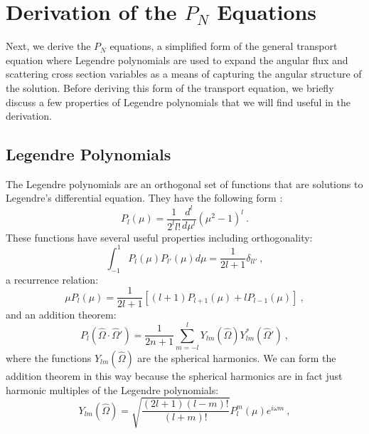 \section{Derivation of the $P_N$ Equations}
\label{sec:pn_equations}
Next, we derive the $P_N$ equations, a simplified form of the general
transport equation where Legendre polynomials are used to expand the
angular flux and scattering cross section variables as a means of
capturing the angular structure of the solution. Before deriving this
form of the transport equation, we briefly discuss a few properties of
Legendre polynomials that we will find useful in the derivation.

\subsection{Legendre Polynomials}
\label{subsec:legendre_polys}
The Legendre polynomials are an orthogonal set of functions that
are solutions to Legendre's differential equation. They have the
following form \citep{lewis_computational_1993}:
\begin{equation}
  P_l(\mu) = \frac{1}{2^l l!}\frac{d^l}{d \mu^l}(\mu^2-1)^l\:.
  \label{eq:general_legendre_poly}
\end{equation}
These functions have several useful properties including
orthogonality:
\begin{equation}
  \int_{-1}^{1} P_l(\mu) P_{l'}(\mu) d\mu = \frac{1}{2l+1}\delta_{l l'}\:,
  \label{eq:legendre_orthog}
\end{equation}
a recurrence relation:
\begin{equation}
  \mu P_l(\mu) = \frac{1}{2l+1}[(l+1)P_{l+1}(\mu) + l P_{l-1}(\mu)]\:,
  \label{eq:legendre_recurrence}
\end{equation}
and an addition theorem:
\begin{equation}
  P_l(\hat{\Omega} \cdot \hat{\Omega}') = \frac{1}{2n+1}\sum_{m=-l}^l
  Y_{lm}(\hat{\Omega})Y^*_{lm}(\hat{\Omega}')\:,
  \label{eq:legendre_addition}
\end{equation}
where the functions $Y_{lm}(\hat{\Omega})$ are the spherical
harmonics. We can form the addition theorem in this way because the
spherical harmonics are in fact just harmonic multiples of the
Legendre polynomials:
\begin{equation}
  Y_{lm}(\hat{\Omega}) =
  \sqrt{\frac{(2l+1)(l-m)!}{(l+m)!}}P^m_l(\mu)e^{i \omega m}\:,
  \label{eq:spherical_harmonic}
\end{equation}

